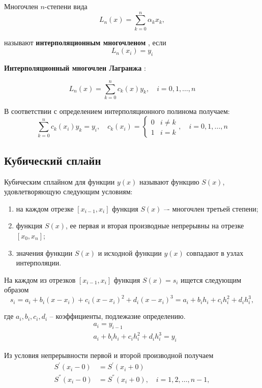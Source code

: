 \documentclass[12pt, a4paper]{article}
\begin{document}
Многочлен $n$-степени вида
\[
    L_n(x) = \displaystyle \sum_{k = 0}^{n} \alpha_kx_k,  
\]

\noindent называют { \bf интерполяционным многочленом }, если 
\[
    L_n(x_i) = y_i   
\]

\pagebreak
{ \bf Интерполяционный многочлен Лагранжа }:

\[
    L_n(x) = \displaystyle \sum_{k = 0}^{n} c_k(x)y_k, \quad i = 0,1,\ldots,n
\]

В соответствии с определением интерполяционного полинома получаем:
\[
    \displaystyle \sum_{k = 0}^{n} c_k(x_i)y_k = y_i, \quad c_k(x_i) =  
    \begin{cases}
        0 & i \neq k \\
        1 & i = k
    \end{cases}, \quad i = 0,1,\ldots,n
\]

\subsection{Кубический сплайн}

Кубическим сплайном для функции $y(x)$ называют функцию $S(x)$, удовлетворяющую следующим условиям:

\begin{enumerate}
    \item на каждом отрезке $ [x_{i - 1}, x_{i}] $ функция $S(x)$ –- многочлен третьей степени;
    \item функция $S(x)$, ее первая и вторая производные непрерывны на отрезке $[x_0, x_n]$;
    \item значения функции $S(x)$ и исходной функции $y(x)$ совпадают в узлах интерполяции.
\end{enumerate}

На каждом из отрезков $ [x_{i - 1}, x_{i}] $ функция $S(x) = s_i$ ищется следующим образом 
\[
    s_i = a_i + b_i(x - x_i) + c_i(x - x_i)^2 + d_i(x - x_i)^3 = a_i + b_i h_i + c_i h_i^2 + d_i h_i^3, 
\]

\noindent где $a_i, b_i, c_i, d_i $ -- коэффициенты, подлежазие определению.
\[
    \begin{split}
        & a_i = y_{i - 1}\\
        & a_i + b_i h_i + c_i h_i^2 + d_i h_i^3 = y_i
    \end{split}
\]

Из условия непрерывности первой и второй производной получаем
\[
    \begin{split}
        S^'(x_i - 0) & = S^'(x_i + 0)  \\
        S^{''}(x_i - 0) & = S^{''}(x_i + 0), \quad i = 1, 2, \ldots, n - 1,
    \end{split} 
\]
\end{document}
